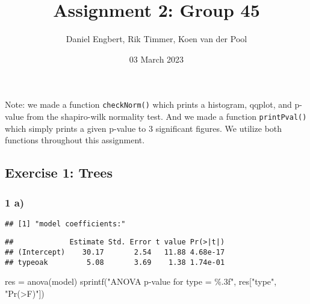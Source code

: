\documentclass[
  11pt,
]{article}
\title{Assignment 2: Group 45}
\author{Daniel Engbert, Rik Timmer, Koen van der Pool}
\date{03 March 2023}
\newenvironment{Shaded}{\begin{snugshade}}{\end{snugshade}}
\newcommand{\AttributeTok}[1]{\textcolor[rgb]{0.77,0.63,0.00}{#1}}
\newcommand{\FunctionTok}[1]{\textcolor[rgb]{0.00,0.00,0.00}{#1}}
\newcommand{\NormalTok}[1]{#1}
\newcommand{\OtherTok}[1]{\textcolor[rgb]{0.56,0.35,0.01}{#1}}
\newcommand{\SpecialCharTok}[1]{\textcolor[rgb]{0.00,0.00,0.00}{#1}}
\newcommand{\StringTok}[1]{\textcolor[rgb]{0.31,0.60,0.02}{#1}}
\begin{document}
\maketitle

Note: we made a function \texttt{checkNorm()} which prints a histogram,
qqplot, and p-value from the shapiro-wilk normality test. And we made a
function \texttt{printPval()} which simply prints a given p-value to 3
significant figures. We utilize both functions throughout this
assignment.

\hypertarget{exercise-1-trees}{%
\subsection{Exercise 1: Trees}\label{exercise-1-trees}}

\hypertarget{a}{%
\subsubsection{1 a)}\label{a}}

\begin{Shaded}
\end{Shaded}

\begin{verbatim}
## [1] "model coefficients:"
\end{verbatim}

\begin{verbatim}
##             Estimate Std. Error t value Pr(>|t|)
## (Intercept)    30.17       2.54   11.88 4.68e-17
## typeoak         5.08       3.69    1.38 1.74e-01
\end{verbatim}

\begin{Shaded}
\begin{Highlighting}[]
\NormalTok{res }\OtherTok{=} \FunctionTok{anova}\NormalTok{(model)}
\FunctionTok{sprintf}\NormalTok{(}\StringTok{"ANOVA p{-}value for type = \%.3f"}\NormalTok{, res[}\StringTok{"type"}\NormalTok{, }\StringTok{"Pr(\textgreater{}F)"}\NormalTok{])}
\end{Highlighting}
\end{Shaded}
\end{document}
